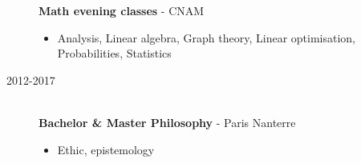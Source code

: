 \documentclass[a4paper,10pt]{article}
\begin{document}
\begin{adjustbox}{valign=t}
\begin{minipage}{0.6\textwidth}
\begin{description}
                  \textbf{Math evening classes} - CNAM
                  \small
                  \begin{itemize}[topsep=0pt]
                      \item Analysis, Linear algebra, Graph theory, Linear optimisation, Probabilities, Statistics
                  \end{itemize}
                  \normalsize
            \item [\normalfont \textcolor{ColorOne}{2012-2017}]~\\
                  \textbf{Bachelor \& Master Philosophy} -  Paris Nanterre\\
                  \small
                  \begin{itemize}[topsep=0pt]
                      \item Ethic, epistemology\\
                  \end{itemize}
                  \normalsize
        \end{description}
    \end{minipage}
\end{adjustbox}
\end{document}
